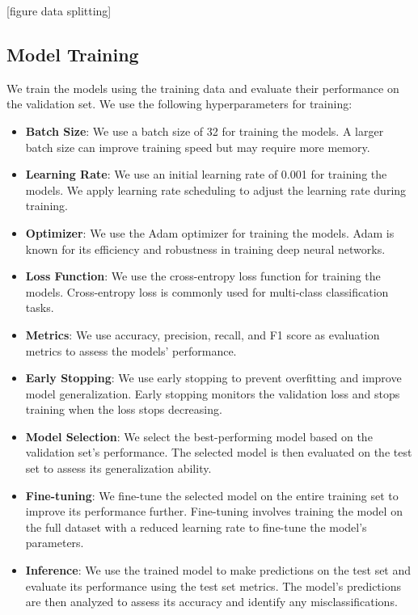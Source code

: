 \documentclass[11pt,a4paper,onecolumn]{article}
\begin{document}
[figure data splitting]

\subsection{Model Training}

We train the models using the training data and evaluate their performance on
the validation set. We use the following hyperparameters for training:

\begin{itemize}
  \item \textbf{Batch Size}: We use a batch size of 32 for training
    the models. A larger batch size can improve training speed but may
    require more memory.
  \item \textbf{Learning Rate}: We use an initial learning rate of
    0.001 for training the models. We apply learning rate scheduling
    to adjust the learning rate during training.
  \item \textbf{Optimizer}: We use the Adam optimizer for training the
    models. Adam is known for its efficiency and robustness in
    training deep neural networks.
  \item \textbf{Loss Function}: We use the cross-entropy loss function
    for training the models. Cross-entropy loss is commonly used for
    multi-class classification tasks.
  \item \textbf{Metrics}: We use accuracy, precision, recall, and F1
    score as evaluation metrics to assess the models' performance.
  \item \textbf{Early Stopping}: We use early stopping to prevent
    overfitting and improve model generalization. Early stopping
    monitors the validation loss and stops training when the loss
    stops decreasing.
  \item \textbf{Model Selection}: We select the best-performing model
    based on the validation set's performance. The selected model is
    then evaluated on the test set to assess its generalization ability.
  \item \textbf{Fine-tuning}: We fine-tune the selected model on the
    entire training set to improve its performance further. Fine-tuning
    involves training the model on the full dataset with a reduced
    learning rate to fine-tune the model's parameters.
  \item \textbf{Inference}: We use the trained model to make
    predictions on the test set and evaluate its performance using the
    test set metrics. The model's predictions are then analyzed to
    assess its accuracy and identify any misclassifications.
  \end{itemize}
\end{document}
